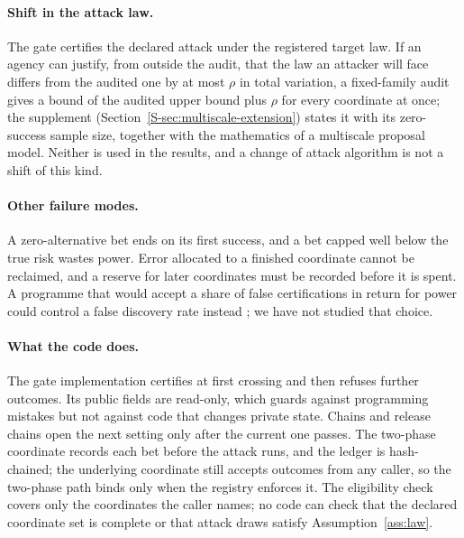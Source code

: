 \documentclass{jpc}
\theoremstyle{remark}
\begin{document}
\paragraph{Shift in the attack law.} The gate certifies the declared attack under the registered target law. If an agency can justify, from outside the audit, that the law an attacker will face differs from the audited one by at most $\rho$ in total variation, a fixed-family audit gives a bound of the audited upper bound plus $\rho$ for every coordinate at once; the supplement (Section~\ref{S-sec:multiscale-extension}) states it with its zero-success sample size, together with the mathematics of a multiscale proposal model. Neither is used in the results, and a change of attack algorithm is not a shift of this kind.

\paragraph{Other failure modes.} A zero-alternative bet ends on its first success, and a bet capped well below the true risk wastes power. Error allocated to a finished coordinate cannot be reclaimed, and a reserve for later coordinates must be recorded before it is spent. A programme that would accept a share of false certifications in return for power could control a false discovery rate instead \cite{benjamini1995,javanmard2018,wang2022}; we have not studied that choice.

\paragraph{What the code does.} The gate implementation certifies at first crossing and then refuses further outcomes. Its public fields are read-only, which guards against programming mistakes but not against code that changes private state. Chains and release chains open the next setting only after the current one passes. The two-phase coordinate records each bet before the attack runs, and the ledger is hash-chained; the underlying coordinate still accepts outcomes from any caller, so the two-phase path binds only when the registry enforces it. The eligibility check covers only the coordinates the caller names; no code can check that the declared coordinate set is complete or that attack draws satisfy Assumption~\ref{ass:law}.
\end{document}
